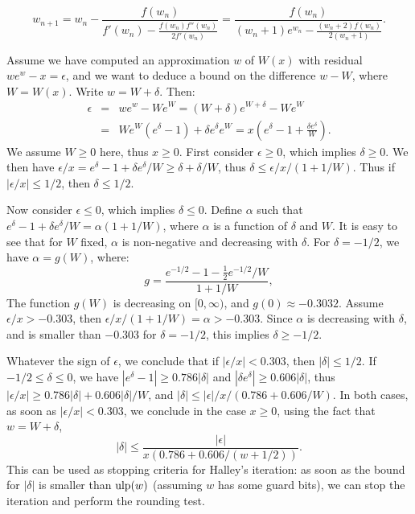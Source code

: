 \documentclass[12pt]{amsart}
\def\ulp{{\rm ulp}}
\begin{document}
\begin{equation} \label{eq:lambertw-halley}
  w_{n+1} = w_n - \dfrac{f(w_n)}{f'(w_n) - \frac{f(w_n) f''(w_n)}{2 f'(w_n)}}
         = \dfrac{f(w_n)}{(w_n+1)e^{w_n} - \frac{(w_n+2) f(w_n)}{2(w_n+1)}}.
\end{equation}

Assume we have computed an approximation $w$ of $W(x)$ with residual
$w e^w - x = \epsilon$, and we want to deduce a bound on the difference
$w - W$, where $W = W(x)$. Write $w = W + \delta$. Then:
\begin{eqnarray*}
\epsilon &=& w e^w - W e^W = (W+\delta) e^{W+\delta} - W e^W \\
         &=& W e^W (e^\delta-1) + \delta e^\delta e^W
             = x (e^\delta - 1 + \frac{\delta e^\delta}{W}).
\end{eqnarray*}
We assume $W \ge 0$ here, thus $x \ge 0$.
First consider $\epsilon \ge 0$, which implies $\delta \ge 0$.
We then have $\epsilon/x = e^\delta-1 + \delta e^\delta/W
\ge \delta + \delta/W$, thus $\delta \le \epsilon/x/(1+1/W)$.
Thus if $|\epsilon/x| \le 1/2$, then $\delta \le 1/2$.

Now consider $\epsilon \le 0$, which implies $\delta \le 0$.
Define $\alpha$ such that
$e^\delta-1+\delta e^\delta/W = \alpha (1+1/W)$,
where $\alpha$ is a function of $\delta$ and $W$.
It is easy to see that for $W$ fixed,
$\alpha$ is non-negative and decreasing with $\delta$.
For $\delta=-1/2$, we have $\alpha = g(W)$, where:
\[ g = \frac{e^{-1/2}-1 - \frac{1}{2} e^{-1/2}/W}{1+1/W}, \]
The function $g(W)$ is decreasing on $[0, \infty)$, and $g(0) \approx -0.3032$.
Assume $\epsilon/x > -0.303$, then $\epsilon/x/(1+1/W) = \alpha > -0.303$.
Since $\alpha$ is decreasing with $\delta$, and is smaller than
$-0.303$ for $\delta=-1/2$, this implies $\delta \ge -1/2$.

Whatever the sign of $\epsilon$, 
we conclude that if $|\epsilon/x| < 0.303$, then $|\delta| \le 1/2$.
If $-1/2 \le \delta \le 0$, we have
$|e^\delta-1| \ge 0.786 |\delta|$ and $|\delta e^\delta| \ge 0.606 |\delta|$,
thus $|\epsilon/x| \ge 0.786 |\delta| + 0.606 |\delta|/W$,
and $|\delta| \le |\epsilon|/x/(0.786 + 0.606/W)$.
In both cases, as soon as $|\epsilon/x| < 0.303$, we conclude
in the case $x \ge 0$, using the fact that $w = W + \delta$,
\[ |\delta| \le \frac{|\epsilon|}{x (0.786 + 0.606/(w+1/2))}. \]
This can be used as stopping criteria for Halley's iteration: as soon as
the bound for $|\delta|$ is smaller than $\ulp(w)$ (assuming $w$ has some
guard bits), we can stop the iteration and perform the rounding test.
\end{document}
